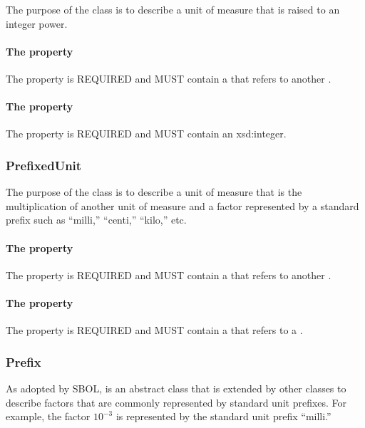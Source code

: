 The purpose of the  class is to describe a unit of measure that is raised to an integer power.

\paragraph{The  property}\label{sec:hasBase}
The  property is REQUIRED and MUST contain a  that refers to another .

\paragraph{The  property}\label{sec:hasExponent}
The  property is REQUIRED and MUST contain an xsd:integer.

\subsubsection{PrefixedUnit}
\label{sec:PrefixedUnit}

The purpose of the  class is to describe a unit of measure that is the multiplication of another unit of measure and a factor represented by a standard prefix such as ``milli,'' ``centi,'' ``kilo,'' etc. 

\paragraph{The  property}\label{sec:hasUnit:PrefixedUnit}
The  property is REQUIRED and MUST contain a  that refers to another . 

\paragraph{The  property}\label{sec:hasPrefix}
The  property is REQUIRED and MUST contain a  that refers to a .

\subsubsection{Prefix}
\label{sec:Prefix}

As adopted by SBOL,  is an abstract class that is extended by other classes to describe factors that are commonly represented by standard unit prefixes. For example, the factor $10^{-3}$ is represented by the standard unit prefix ``milli.'' 

